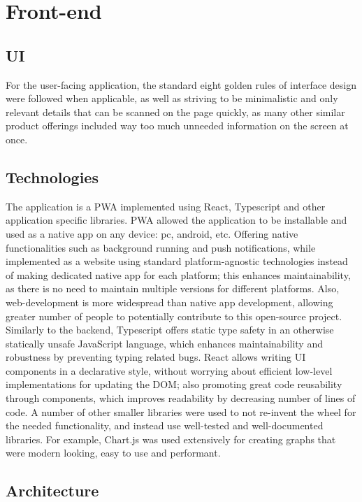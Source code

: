 \section{Front-end}
\subsection{UI}
For the user-facing application, the standard eight golden rules of interface design \cite{goldenRulesUI} were followed when applicable, as well as striving to be minimalistic and only relevant details that can be scanned on the page quickly, as many other similar product offerings included way too much unneeded information on the screen at once. 
\subsection{Technologies}
The application is a PWA implemented using React, Typescript and other application specific libraries. PWA allowed the application to be installable and used as a native app on any device: pc, android, etc. Offering native functionalities such as background running and push notifications, while implemented as a website using standard platform-agnostic technologies instead of making dedicated native app for each platform; this enhances maintainability, as there is no need to maintain multiple versions for different platforms. Also, web-development is more widespread than native app development, allowing greater number of people to potentially contribute to this open-source project. Similarly to the backend, Typescript offers static type safety in an otherwise statically unsafe JavaScript language, which enhances maintainability and robustness by preventing typing related bugs. React allows writing UI components in a declarative style, without worrying about efficient low-level implementations for updating the DOM; also promoting great code reusability through components, which improves readability by decreasing number of lines of code. A number of other smaller libraries were used to not re-invent the wheel for the needed functionality, and instead use well-tested and well-documented libraries. For example, Chart.js was used extensively for creating graphs that were modern looking, easy to use and performant. 
\subsection{Architecture}

